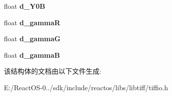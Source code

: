 \begin{DoxyCompactItemize}
\item 
\mbox{\label{struct_t_i_f_f_display_a9286c57976cbc5130794e8d7ebc3fca9}} 
float {\bfseries d\+\_\+\+Y0B}
\item 
\mbox{\label{struct_t_i_f_f_display_a5d8c8f1c2c0941ae74e87b2e07f7ad19}} 
float {\bfseries d\+\_\+gammaR}
\item 
\mbox{\label{struct_t_i_f_f_display_a11a58e28bb1b40f5e323429f70a73ab5}} 
float {\bfseries d\+\_\+gammaG}
\item 
\mbox{\label{struct_t_i_f_f_display_ac95c758dda3637c6a7fc4eee36346126}} 
float {\bfseries d\+\_\+gammaB}
\end{DoxyCompactItemize}


该结构体的文档由以下文件生成\+:\begin{DoxyCompactItemize}
\item 
E\+:/\+React\+O\+S-\/0../sdk/include/reactos/libs/libtiff/tiffio.\+h\end{DoxyCompactItemize}
